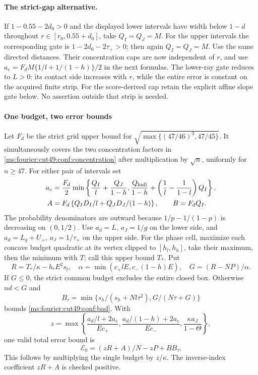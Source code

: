 \paragraph{The strict-gap alternative.}
If $1-0.55-2d_0>0$ and the displayed lower intervals have width below
$1-d$ throughout $r\in[r_0,0.55+d_0]$, take $Q_I=Q_J=M$.
For the upper intervals the corresponding gate is
$1-2d_0-2\tau_+>0$; then again $Q_I=Q_J=M$.
Use the same directed distances. Their concentration caps are now
independent of $r$, and use
$a_e=F_dM\{1/l+1/(1-h)\}/2$ in the next formulas.
The lower-ray gate reduces to $L>0$: its contact side increases with
$r$, while the entire error is constant on the acquired finite strip.
For the score-derived cap retain the explicit affine slope gate below.
No assertion outside that strip is needed.

\paragraph{One budget, two error bounds}
Let $F_d$ be the strict grid upper bound for
$\sqrt{\max\{(47/46)^3,47/45\}}$. It simultaneously covers the two
concentration factors in \eqref{ms:fourier:cut49:conf:concentration} after multiplication by
$\sqrt n$, uniformly for $n\ge47$. For either pair of intervals set
\begin{align*}
 a_e&=\frac{F_d}{2}\min\left\{\frac{Q_I}l+\frac{Q_J}{1-h},
 \frac{Q_{\rm hull}}{1-h}+\left(\frac1l-\frac1{1-l}\right)Q_I\right\},\\
 A&=F_d\left\{Q_ID_I/l+Q_JD_J/(1-h)\right\},\qquad B=F_dQ_I.
\end{align*}
The probability denominators are outward because $1/p-1/(1-p)$ is
decreasing on $(0,1/2)$.
Use $a_d=L$, $a_J=1/g$ on the lower side, and
$a_d=L_g+U_+$, $a_J=1/\tau_+$ on the upper side.
For the phase cell, maximize each concave budget quadratic at its
vertex clipped to $[h_l,h_h]$, take their maximum, then the minimum
with $T$; call this upper bound $T_*$. Put
\[
 R=T_*/\kappa-b_*E^2s_l,
 \quad\alpha=\min(c_+lE,c_-(1-h)E),\quad G=(R-NP)/\alpha.
\]
If $G\le0$, the strict common budget excludes the entire closed box.
Otherwise $nd<G$ and
\[
 B_\tau=\min\{s_h/(s_h+Nl\tau^2),G/(N\tau+G)\}
\]
bounds \eqref{ms:fourier:cut49:conf:bad}. With
\[
 z=\max\left\{\frac{a_d/l+2a_e}{Ec_+},
 \frac{a_d/(1-h)+2a_e}{Ec_-},\frac{\kappa a_J}{1-\Theta}\right\},
\]
one valid total error bound is
\begin{equation}\label{ms:fourier:cut49:conf:oldbound}
 \mathcal E_0=(zR+A)/N-zP+B B_\tau.
\end{equation}
This follows by multiplying the single budget by $z/\kappa$.
The inverse-index coefficient $zR+A$ is checked positive.


